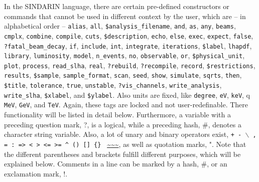 \documentclass[12pt]{book}
\newcommand{\ttt}[1]{\texttt{#1}}
\begin{document}
In the SINDARIN language, there are certain pre-defined constructors or
commands that cannot be used in different context by the user, which
are -- in alphabetical order -- \ttt{alias}, \ttt{all},
\ttt{\$analysis\_filename}, \ttt{and}, \ttt{as}, 
\ttt{any}, \ttt{beams}, \ttt{cmplx},
\ttt{combine}, \ttt{compile}, \ttt{cuts}, 
\ttt{\$description},
\ttt{echo}, \ttt{else}, \ttt{exec}, \ttt{expect},
\ttt{false}, \ttt{?fatal\_beam\_decay},
\ttt{if}, \ttt{include},
\ttt{int}, \ttt{integrate}, \ttt{iterations}, \ttt{\$label}, \ttt{lhapdf},
\ttt{library}, \ttt{luminosity},
\ttt{model}, \ttt{n\_events}, \ttt{no}, \ttt{observable}, \ttt{or}, 
\ttt{\$physical\_unit}, 
\ttt{plot}, \ttt{process}, \ttt{read\_slha},
\ttt{real}, \ttt{?rebuild}, \ttt{?recompile}, \ttt{record},
\ttt{\$restrictions}, \ttt{results}, 
\ttt{\$sample}, \ttt{sample\_format},
\ttt{scan}, \ttt{seed}, 
\ttt{show}, \ttt{simulate}, \ttt{sqrts}, 
\ttt{then}, \ttt{\$title}, \ttt{tolerance}, \ttt{true}, \ttt{unstable}, 
\ttt{?vis\_channels},
\ttt{write\_analysis}, \ttt{write\_slha},
\ttt{\$xlabel}, and \ttt{\$ylabel}. Also units 
are fixed, like \ttt{degree}, \ttt{eV}, \ttt{keV}, q 
\ttt{MeV}, \ttt{GeV}, and \ttt{TeV}. Again, these tags are locked and
not user-redefinable. There functionality will be listed in detail
below. Furthermore, a variable with a preceding
question mark, ?, is a logical, while a preceding hash, \#, denotes a
character string variable.  Also, a lot of unary and binary operators
exist, \ttt{+ - $\backslash$ , = : => < > <= >= \^ \;  () [] \{\} }
\url{~}\url{~~}, as well as quotation marks, ". Note that the
different parentheses and brackets fulfill different purposes, which
will be explained below. Comments in a line can be marked by a hash,
\#, or an exclamation mark, !.   
\end{document}
